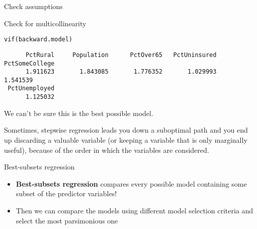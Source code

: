 \documentclass{beamer}\usepackage[]{graphicx}\usepackage[]{color}
\makeatletter
\newcommand{\hlstd}[1]{\textcolor[rgb]{1,0.894,0.769}{#1}}%
\newcommand{\hlkwd}[1]{\textcolor[rgb]{1,0.78,0.769}{#1}}%
\newenvironment{kframe}{%
 \def\at@end@of@kframe{}%
 \ifinner\ifhmode%
  \def\at@end@of@kframe{\end{minipage}}%
  \begin{minipage}{\columnwidth}%
 \fi\fi%
 \def\FrameCommand##1{\hskip\@totalleftmargin \hskip-\fboxsep
 \colorbox{shadecolor}{##1}\hskip-\fboxsep
     \hskip-\linewidth \hskip-\@totalleftmargin \hskip\columnwidth}%
 \MakeFramed {\advance\hsize-\width
   \@totalleftmargin\z@ \linewidth\hsize
   \@setminipage}}%
 {\par\unskip\endMakeFramed%
 \at@end@of@kframe}
\newenvironment{knitrout}{}{} %
\makeatother
\begin{document}
\begin{darkframes}
\begin{frame}[fragile]{Check assumptions}
\begin{knitrout}
\end{knitrout}

    \end{frame}


    \begin{frame}[fragile]{Check for multicollinearity}
      \fontsize{8}{8}\selectfont
\begin{knitrout}
\begin{kframe}
\begin{alltt}
\hlkwd{vif}\hlstd{(backward.model)}
\end{alltt}
\begin{verbatim}
      PctRural     Population      PctOver65   PctUninsured PctSomeCollege 
      1.911623       1.843085       1.776352       1.029993       1.541539 
 PctUnemployed 
      1.125032 
\end{verbatim}
\end{kframe}
\end{knitrout}
    \end{frame}

    \begin{frame}
      \begin{center}
        We can't be sure this is the best possible model.

        \bigskip

        Sometimes, stepwise regression leads you down a suboptimal path and you end up discarding a valuable variable (or keeping a variable that is only marginally useful), because of the order in which the variables are considered.
      \end{center}
    \end{frame}

    \begin{frame}{Best-subsets regression}
      \begin{itemize}[<+->]
        \item \textbf{Best-subsets regression} compares every possible model containing some subset of the predictor variables!
        \item Then we can compare the models using different model selection criteria and select the most parsimonious one
      \end{itemize}
    \end{frame}


\end{darkframes}
\end{document}
